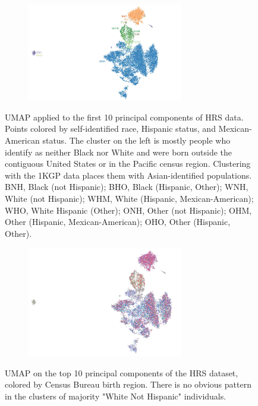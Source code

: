 \documentclass[12pt]{pnas-new}
\begin{document}
\begin{figure}
    \centering
    \begin{subfigure}{0.95\textwidth}
    \includegraphics[width=0.75\textwidth]{images/HRS_1000G_NP1_UMAP_PC10_NC2_NN15_MD05_pca_1kgp_onto_hrs_umap_1kgp_onto_hrs_2018112221116_race_hisp_mex_labels.pdf}
    \end{subfigure}
    \caption{UMAP applied to the first 10 principal components of HRS data. Points colored by self-identified race, Hispanic status, and Mexican-American status. The cluster on the left is mostly people who identify as neither Black nor White and were born outside the contiguous United States or in the Pacific census region. Clustering with the 1KGP data places them with Asian-identified populations. BNH, Black (not Hispanic); BHO, Black (Hispanic, Other); WNH, White (not Hispanic); WHM, White (Hispanic, Mexican-American); WHO, White Hispanic (Other); ONH, Other (not Hispanic); OHM, Other (Hispanic, Mexican-American); OHO, Other (Hispanic, Other).}
    \label{fig:supp_umap_hrs_eth}
\end{figure}

\begin{figure}
    \centering
    \begin{subfigure}{\textwidth}
    \includegraphics[width=0.75\textwidth]{images/HRS_1000G_NP1_UMAP_PC10_NC2_NN15_MD05_pca_1kgp_onto_hrs_umap_1kgp_onto_hrs_2018112221116_born.pdf}
    \end{subfigure}
    \caption{UMAP on the top 10 principal components of the HRS dataset, colored by Census Bureau birth region. There is no obvious pattern in the clusters of majority "White Not Hispanic" individuals.}
    \label{fig:supp_hrs_born}
\end{figure}
\end{document}
